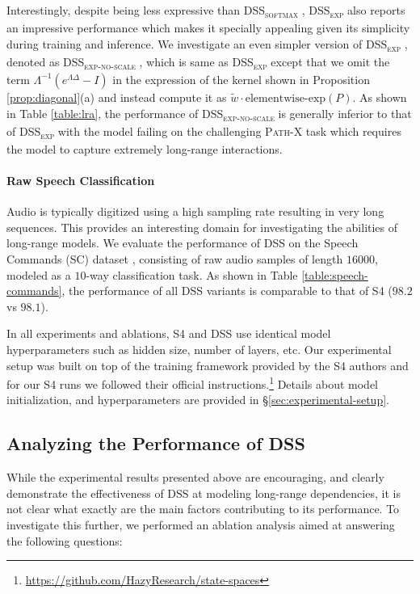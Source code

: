 Interestingly, despite being less expressive than \textsc{DSS}\textsubscript{\textsc{softmax}} , \textsc{DSS}\textsubscript{\textsc{exp}}  also reports an impressive performance which makes it specially appealing given its simplicity during training and inference. We investigate an even simpler version of \textsc{DSS}\textsubscript{\textsc{exp}} , denoted as \textsc{DSS}\textsubscript{\textsc{exp-no-scale}} , which is same as \textsc{DSS}\textsubscript{\textsc{exp}}  except that we omit the term $\Lambda^{-1} (e^{\Lambda\Delta} - I)$ in the expression of the kernel shown in Proposition \ref{prop:diagonal}(a) and instead compute it as $\widetilde{w} \cdot \mathrm{elementwise}\text{-}\mathrm{exp}(P)$. As shown in Table \ref{table:lra}, the performance of \textsc{DSS}\textsubscript{\textsc{exp-no-scale}}  is generally inferior to that of \textsc{DSS}\textsubscript{\textsc{exp}}  with the model failing on the challenging \textsc{Path-X} task which requires the model to capture extremely long-range interactions.

\paragraph{Raw Speech Classification} Audio is typically digitized using a high sampling rate resulting in very long sequences. This provides an interesting domain for investigating the abilities of long-range models. We evaluate the performance of DSS on the Speech Commands (\textsc{SC}) dataset \cite{Warden2018SpeechCA}, consisting of raw audio samples of length $16000$, modeled as a $10$-way classification task. As shown in Table \ref{table:speech-commands}, the performance of all DSS variants is comparable to that of S4 ($98.2$ vs $98.1$).

In all experiments and ablations, S4 and DSS use identical model hyperparameters such as hidden size, number of layers, etc. Our experimental setup was built on top of the training framework provided by the S4 authors and for our S4 runs we followed their official instructions.\footnote{\url{https://github.com/HazyResearch/state-spaces}} 
Details about model initialization, and hyperparameters are provided in \S\ref{sec:experimental-setup}.

\subsection{Analyzing the Performance of DSS}\label{sec:performance-analysis}

While the experimental results presented above are encouraging, and clearly demonstrate the effectiveness of DSS at modeling long-range dependencies, it is not clear what exactly are the main factors contributing to its performance. To investigate this further, we performed an ablation analysis aimed at answering the following questions:


